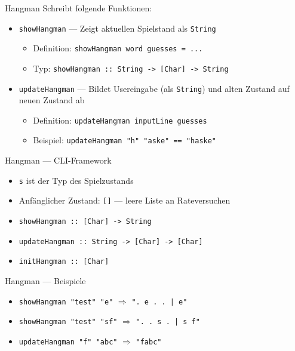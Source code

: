 \documentclass{beamer}
\begin{document}
\begin{frame}{Hangman}
        Schreibt folgende Funktionen:
	\begin{itemize}
		\item \texttt{showHangman} --- Zeigt aktuellen Spielstand als \texttt{String}
		\begin{itemize}
			\item Definition: \texttt{showHangman word guesses = ...}
			\item Typ: \texttt{showHangman :: String -> [Char] -> String}
		\end{itemize}
		\item \texttt{updateHangman} --- Bildet Usereingabe (als \texttt{String}) und alten Zustand auf neuen Zustand ab
		\begin{itemize}
			\item Definition: \texttt{updateHangman inputLine guesses}
			\item Beispiel: \texttt{updateHangman "h" "aske" == "haske"}
		\end{itemize}
	\end{itemize}
\end{frame}

\begin{frame}{Hangman --- CLI-Framework}

	\begin{itemize}
		\item \texttt{s} ist der Typ des Spielzustands
		\item Anfänglicher Zustand: \texttt{[]} --- leere Liste an Rateversuchen
                \item \texttt{showHangman :: [Char] -> String}
		\pause
                \item \texttt{updateHangman :: String -> [Char] -> [Char]}
		\pause
                \item \texttt{initHangman :: [Char]}
	\end{itemize}
\end{frame}

\begin{frame}{Hangman --- Beispiele}
	\begin{itemize}
          \item \texttt{showHangman "{}test"{} "{}e"{}} $\Rightarrow$ \texttt{"{}. e . . | e"{}}
          \item \texttt{showHangman "{}test"{} "{}sf"{}} $\Rightarrow$ \texttt{"{}. . s . | s f"{}}
          \item \texttt{updateHangman "{}f"{} "{}abc"{}} $\Rightarrow$ \texttt{"{}fabc"{}}
	\end{itemize}
\end{frame}
\end{document}
